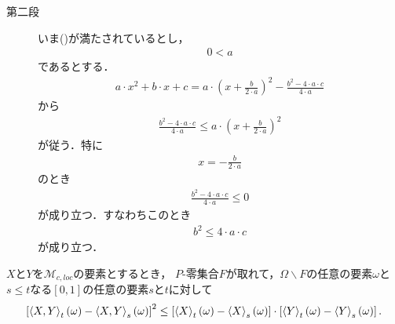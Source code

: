 \begin{sketch}
\begin{description}
			\item[第二段] 
				いま()が満たされているとし，
				\begin{align}
					0 < a
				\end{align}
				であるとする．
				\begin{align}
					a \cdot x^{2} + b \cdot x + c
					= a \cdot \left(x+\frac{b}{2 \cdot a}\right)^{2} - \frac{b^{2} - 4 \cdot a \cdot c}{4 \cdot a}
				\end{align}
				から
				\begin{align}
					\frac{b^{2} - 4 \cdot a \cdot c}{4 \cdot a}
					\leq a \cdot \left(x+\frac{b}{2 \cdot a}\right)^{2}
				\end{align}
				が従う．特に
				\begin{align}
					x = -\frac{b}{2 \cdot a}
				\end{align}
				のとき
				\begin{align}
					\frac{b^{2} - 4 \cdot a \cdot c}{4 \cdot a} \leq 0
				\end{align}
				が成り立つ．すなわちこのとき
				\begin{align}
					b^{2} \leq 4 \cdot a \cdot c
				\end{align}
				が成り立つ．
				\QED
		\end{description}
	\end{sketch}
	
	\begin{screen}
		\begin{thm}[二次変分に対するSchwartzの不等式]
		\label{thm:Schwartz_inequality_for_quadratic_variations}
			$X$と$Y$を$\mathscr{M}_{c,loc}$の要素とするとき，
			$P$-零集合$F$が取れて，$\Omega \backslash F$の任意の要素$\omega$と
			$s \leq t$なる$[0,1]$の任意の要素$s$と$t$に対して
			\begin{align}
				\left[\inprod<X,Y>_{t}(\omega) - \inprod<X,Y>_{s}(\omega)\right]^{2}
				\leq \left[\inprod<X>_{t}(\omega) - \inprod<X>_{s}(\omega)\right] 
				\cdot \left[\inprod<Y>_{t}(\omega) - \inprod<Y>_{s}(\omega)\right].
			\end{align}
		\end{thm}
	\end{screen}
	
